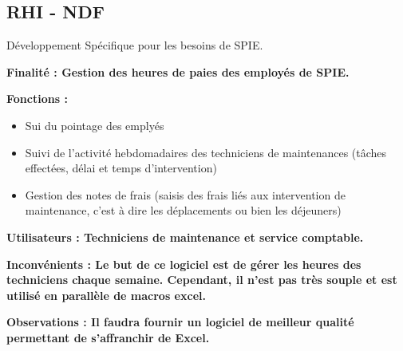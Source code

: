 \subsection{RHI - NDF}
Développement Spécifique pour les besoins de SPIE.
\begin{description}
    \item \bf{Finalité :} Gestion des heures de paies des employés de SPIE. \\
    \item \bf{Fonctions :}
    \begin{itemize}
        \item Sui du pointage des emplyés
        \item Suivi de l’activité hebdomadaires des techniciens de maintenances (tâches effectées, délai et temps d’intervention)
        \item Gestion des notes de frais (saisis des frais liés aux intervention de maintenance, c’est à dire les déplacements ou bien les déjeuners) \\
    \end{itemize}
    \item \bf{Utilisateurs :} Techniciens de maintenance et service comptable. \\
    \item \bf{Inconvénients :} Le but de ce logiciel est de gérer les heures des techniciens chaque semaine. Cependant, il n’est pas très souple et est utilisé en parallèle de macros excel. \\
\end{description}

\bf{Observations :} Il faudra fournir un logiciel de meilleur qualité permettant de s’affranchir de Excel.


